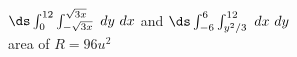 {\noindent \begin{minipage}{\linewidth}
\end{minipage}
}
{$\ds\int_0^{12}\int_{-\sqrt{3x}}^{\sqrt{3x}}\ dy\ dx$ and $\ds \int_{-6}^6\int_{y^2/3}^{12}\ dx\ dy$\\
area  of $R = 96u^2$
}
